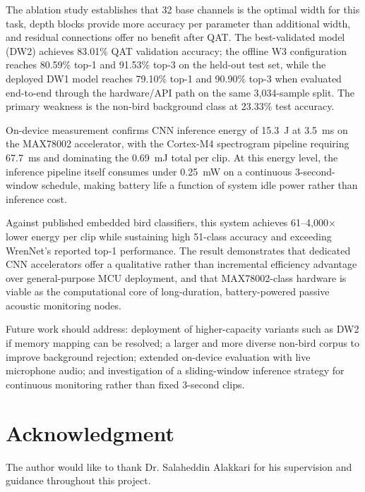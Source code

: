 \documentclass[conference]{IEEEtran}
\begin{document}
The ablation study establishes that 32 base channels is the optimal width for this task, depth blocks provide more accuracy per parameter than additional width, and residual connections offer no benefit after QAT. The best-validated model (DW2) achieves 83.01\% QAT validation accuracy; the offline W3 configuration reaches 80.59\% top-1 and 91.53\% top-3 on the held-out test set, while the deployed DW1 model reaches 79.10\% top-1 and 90.90\% top-3 when evaluated end-to-end through the hardware/API path on the same 3,034-sample split. The primary weakness is the non-bird background class at 23.33\% test accuracy.

On-device measurement confirms CNN inference energy of 15.3~\textmu J at 3.5~ms on the MAX78002 accelerator, with the Cortex-M4 spectrogram pipeline requiring 67.7~ms and dominating the 0.69~mJ total per clip. At this energy level, the inference pipeline itself consumes under 0.25~mW on a continuous 3-second-window schedule, making battery life a function of system idle power rather than inference cost.

Against published embedded bird classifiers, this system achieves 61--4{,}000$\times$ lower energy per clip while sustaining high 51-class accuracy and exceeding WrenNet's reported top-1 performance. The result demonstrates that dedicated CNN accelerators offer a qualitative rather than incremental efficiency advantage over general-purpose MCU deployment, and that MAX78002-class hardware is viable as the computational core of long-duration, battery-powered passive acoustic monitoring nodes.

Future work should address: deployment of higher-capacity variants such as DW2 if memory mapping can be resolved; a larger and more diverse non-bird corpus to improve background rejection; extended on-device evaluation with live microphone audio; and investigation of a sliding-window inference strategy for continuous monitoring rather than fixed 3-second clips.

\section*{Acknowledgment}
The author would like to thank Dr. Salaheddin Alakkari for his supervision and guidance throughout this project.
\end{document}
